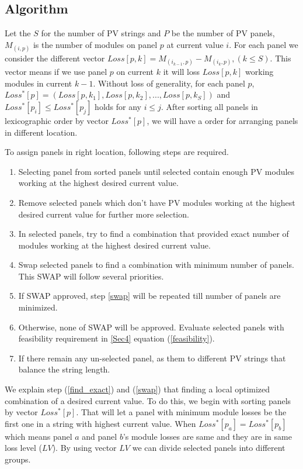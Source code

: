 \documentclass[conference]{IEEEtran}
\begin{document}
\subsection{Algorithm}

Let the $S$ for the number of PV strings and $P$ be the number of PV panels, $M_{(i,p)}$ is the number of modules on panel $p$ at current value $i$. For each panel we consider the different vector $Loss[p,k] = M_{(i_{k-1},p)}-M_{(i_{k},p)} ,(k \leq S)$. This vector means if we use panel $p$ on current $k$  it will loss $Loss[p,k]$ working modules in current $k-1$. Without loss of generality, for each panel $p$, $Loss^*[p] = ( Loss[p,k_1], Loss[p,k_2],..., Loss[p,k_S] )$ and $Loss^*[p_i] \leq Loss^*[p_j]$ holds for any $i \leq j$. After sorting all panels in lexicographic order by vector $Loss^*[p]$, we will have a order for arranging panels in different location.

To assign panels in right location, following steps are required.
\begin{enumerate}[(1)]
\item Selecting panel from sorted panels until selected contain enough PV modules working at the highest desired current value.
\item Remove selected panels which don't have PV modules working at the highest desired current value for further more selection.
\item In selected panels, try to find a combination that provided exact number of modules working at the highest desired current value.\label{find_exact}
\item Swap selected panels to find a combination with minimum number of panels. This SWAP will follow several priorities.\label{swap}
\item If SWAP approved, step \ref{swap} will be repeated till number of panels are minimized.
\item Otherwise, none of SWAP will be approved. Evaluate selected panels with feasibility requirement in \ref{Sec4} equation (\ref{feasibility}).
\item If there remain any un-selected panel, as them to different PV strings that balance the string length.
\end{enumerate}

We explain step (\ref{find_exact}) and (\ref{swap}) that finding a local optimized combination of a desired current value. To do this, we begin with sorting panels by vector $Loss^*[p]$. That will let a panel with minimum module losses be the first one in a string with highest current value. When $Loss^*[p_a] = Loss^*[p_b]$ which means panel $a$ and panel $b$'s module losses are same and they are in same loss level ($LV$). By using vector $LV$ we can divide selected panels into different groups.
\end{document}
